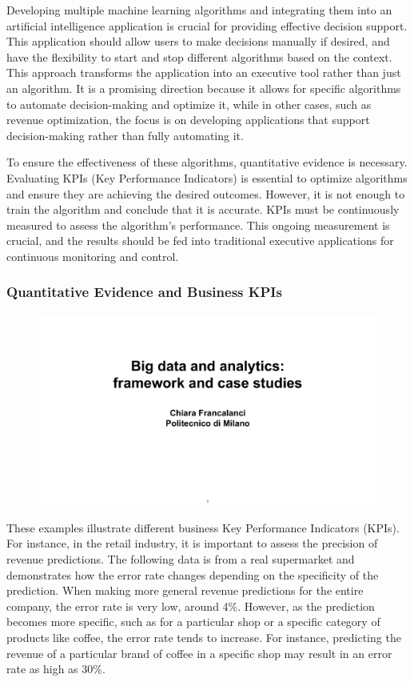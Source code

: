 Developing multiple machine learning algorithms and integrating them
into an artificial intelligence application is crucial for providing
effective decision support. This application should allow users to make
decisions manually if desired, and have the flexibility to start and
stop different algorithms based on the context. This approach transforms
the application into an executive tool rather than just an algorithm. It
is a promising direction because it allows for specific algorithms to
automate decision-making and optimize it, while in other cases, such as
revenue optimization, the focus is on developing applications that
support decision-making rather than fully automating it.

To ensure the effectiveness of these algorithms, quantitative evidence
is necessary. Evaluating KPIs (Key Performance Indicators) is essential
to optimize algorithms and ensure they are achieving the desired
outcomes. However, it is not enough to train the algorithm and conclude
that it is accurate. KPIs must be continuously measured to assess the
algorithm's performance. This ongoing measurement is crucial, and the
results should be fed into traditional executive applications for
continuous monitoring and control.

\subsubsection{Quantitative Evidence and Business KPIs}

\begin{figure}[!h]
  \centering
  \includegraphics[page=23, trim = 1cm 1.5cm 0 1cm 0cm, clip, width=\imagewidth]{images/06 - BIG_DATA.pdf}
\end{figure}

These examples illustrate different business Key Performance Indicators
(KPIs). For instance, in the retail industry, it is important to assess
the precision of revenue predictions. The following data is from a real
supermarket and demonstrates how the error rate changes depending on the
specificity of the prediction. When making more general revenue
predictions for the entire company, the error rate is very low, around
4\%. However, as the prediction becomes more specific, such as for a
particular shop or a specific category of products like coffee, the
error rate tends to increase. For instance, predicting the revenue of a
particular brand of coffee in a specific shop may result in an error
rate as high as 30\%.

